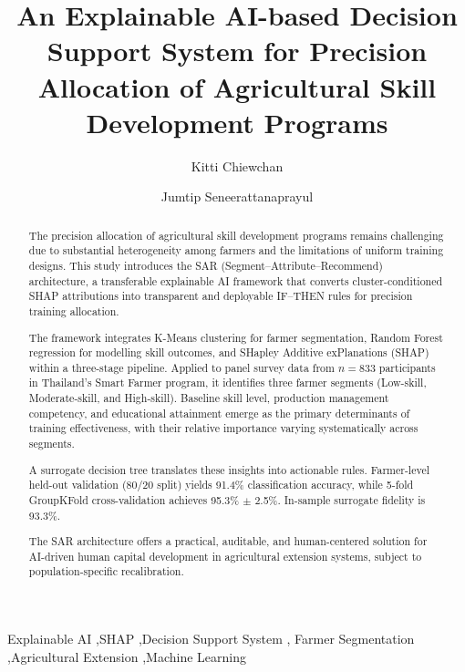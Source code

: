 \documentclass[3p,twocolumn,authoryear]{elsarticle}
\begin{document}
\begin{frontmatter}

\title{An Explainable AI-based Decision Support System for Precision
       Allocation of Agricultural Skill Development Programs}

\author[inst1]{Kitti Chiewchan}
\author[inst2]{Jumtip Seneerattanaprayul}

\address[inst1]{Computer Education Program, Faculty of Education,
  Bansomdejchaopraya Rajabhat University,
  1061 Issaraphap Road, Hirunrujee, Thonburi, Bangkok 10600, Thailand}
\address[inst2]{Department of Agricultural and Resource Economics,
  Faculty of Economics, Kasetsart University,
  50 Ngam Wong Wan Road, Ladyao, Jatujak, Bangkok 10110, Thailand}

\begin{abstract}
The precision allocation of agricultural skill development programs remains challenging due to substantial heterogeneity among 
farmers and the limitations of uniform training designs. This study introduces the SAR (Segment--Attribute--Recommend) 
architecture, a transferable explainable AI framework that converts cluster-conditioned SHAP attributions into transparent 
and deployable IF--THEN rules for precision training allocation.

The framework integrates K-Means clustering for farmer segmentation, Random Forest regression for modelling skill outcomes,
 and SHapley Additive exPlanations (SHAP) within a three-stage pipeline. Applied to panel survey data from $n=833$ 
 participants in Thailand's Smart Farmer program, it identifies three farmer segments (Low-skill, Moderate-skill, 
 and High-skill). Baseline skill level, production management competency, and educational attainment emerge as 
 the primary determinants of training effectiveness, with their relative importance varying systematically across segments.

A surrogate decision tree translates these insights into actionable rules. Farmer-level held-out validation 
(80/20 split) yields 91.4\% classification accuracy, while 5-fold GroupKFold cross-validation achieves 95.3\% $\pm$ 2.5\%. 
In-sample surrogate fidelity is 93.3\%. 

The SAR architecture offers a practical, auditable, and human-centered solution for AI-driven 
human capital development in agricultural extension systems, subject to population-specific recalibration.
\end{abstract}

\begin{keyword}
Explainable AI \sep SHAP \sep Decision Support System \sep
Farmer Segmentation \sep Agricultural Extension \sep Machine Learning
\end{keyword}

\end{frontmatter}
\end{document}
